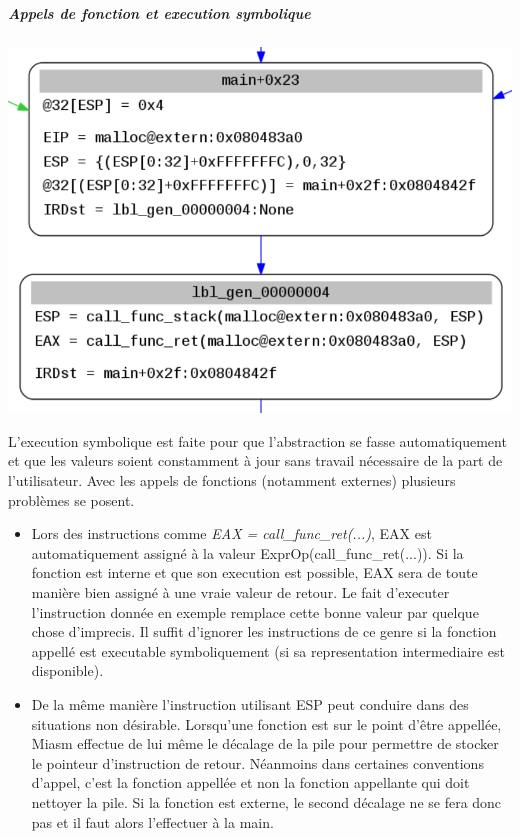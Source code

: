 \subparagraph{Appels de fonction et execution symbolique}
\begin{center}
\includegraphics[scale=0.3]{ir.png}\newline
\end{center}
L'execution symbolique est faite pour que l'abstraction se fasse automatiquement et que les valeurs soient constamment à jour sans travail nécessaire de la part de l'utilisateur. Avec les appels de
fonctions (notamment externes) plusieurs problèmes se posent.
\begin{itemize}
    \item Lors des instructions comme \textit{EAX = call\_func\_ret(...)}, EAX est automatiquement assigné à la valeur ExprOp(call\_func\_ret(...)). Si la fonction est interne et que
    son execution est possible, EAX sera de toute manière bien assigné à une vraie valeur de retour. Le fait d'executer l'instruction donnée en exemple remplace cette bonne valeur par quelque
    chose d'imprecis.\newline
    Il suffit d'ignorer les instructions de ce genre si la fonction appellé est executable symboliquement (si sa representation intermediaire est disponible).
    \item De la même manière l'instruction utilisant ESP peut conduire dans des situations non désirable. Lorsqu'une fonction est sur le point d'être appellée, Miasm effectue de lui même le décalage de la pile pour permettre de stocker le pointeur d'instruction de retour.\newline
    Néanmoins dans certaines conventions d'appel, c'est la fonction appellée et non la fonction appellante qui doit nettoyer la pile. Si la fonction est externe, le second décalage ne se fera donc pas et il faut alors l'effectuer à la main.
\end{itemize}

